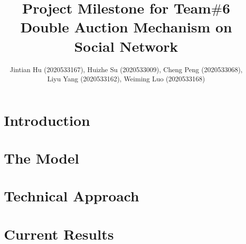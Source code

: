 \documentclass[format=acmsmall, review=false, natbib=false]{acmart}
\title{Project Milestone for Team$\#$6\\
	Double Auction Mechanism on Social Network
}
\author{Jintian Hu (2020533167), Huizhe Su (2020533009), Cheng Peng (2020533068), Liyu Yang (2020533162), Weiming Luo (2020533168)}
\begin{document}
\maketitle

\section{Introduction}


\section{The Model}


\section{Technical Approach}


\section{Current Results}



\nocite{*}

\printbibliography
\end{document}
